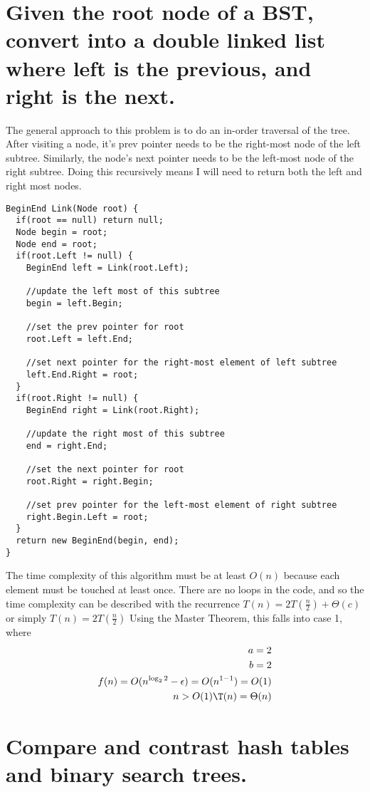 \documentclass{article}
\begin{document}
\section{Given the root node of a BST, convert into a double linked list where left is the previous, and right is the next.}
The general approach to this problem is to do an in-order traversal of the tree.
After visiting a node, it's prev pointer needs to be the right-most node of the left subtree.
Similarly, the node's next pointer needs to be the left-most node of the right subtree.
Doing this recursively means I will need to return both the left and right most nodes.
\begin{lstlisting}
BeginEnd Link(Node root) {
  if(root == null) return null;
  Node begin = root;
  Node end = root;
  if(root.Left != null) {
    BeginEnd left = Link(root.Left);

    //update the left most of this subtree
    begin = left.Begin; 

    //set the prev pointer for root
    root.Left = left.End; 

    //set next pointer for the right-most element of left subtree
    left.End.Right = root; 
  }
  if(root.Right != null) {
    BeginEnd right = Link(root.Right);

    //update the right most of this subtree
    end = right.End;

    //set the next pointer for root
    root.Right = right.Begin;

    //set prev pointer for the left-most element of right subtree
    right.Begin.Left = root;
  }
  return new BeginEnd(begin, end);
}
\end{lstlisting}
The time complexity of this algorithm must be at least \(O(n)\) because each element must be touched at least once.
There are no loops in the code, and so the time complexity can be described with the recurrence \(T(n) = 2T(\frac{n}{2}) + \Theta(c)\) or simply \(T(n) = 2T(\frac{n}{2})\)
Using the Master Theorem, this falls into case 1, where 
\begin{align*}
    a = 2 \\
    b = 2 \\
    f(n) = O(n^{\log_2{2}} - \epsilon) = O(n^{1 - 1}) = O(1) \\
    n > O(1)
    \T(n) = \Theta(n)
\end{align*}

\section{Compare and contrast hash tables and binary search trees.}
\end{document}

